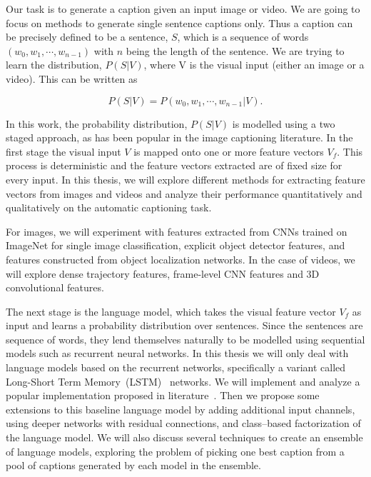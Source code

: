 Our task is to generate a caption given an input image or video. 
We are going to focus on methods to generate single sentence captions only. 
Thus a caption can be precisely defined to be a sentence, $S$, which is a
sequence of words $(w_0, w_1,\cdots, w_{n-1})$ with $n$ being the length of the
sentence. 
We are trying to learn the distribution, $P(S|V)$, where V is the visual
input (either an image or a video). 
This can be written as 

\begin{equation}
\label{eq:langB1} P(S|V) = P(w_0, w_1, \cdots, w_{n-1}|V)  .
\end{equation}

In this work, the probability distribution, $P(S|V)$ is modelled using a two
staged approach, as has been popular in the image captioning literature. 
In the first stage the visual input $V$ is mapped onto one or more feature
vectors $V_f$.
This process is deterministic and the feature vectors extracted are of fixed
size for every input. 
In this thesis, we will explore different methods for extracting feature
vectors from images and videos and analyze their performance quantitatively and
qualitatively on the automatic captioning task. 

For images, we will experiment with features extracted from CNNs trained on
ImageNet for single image classification, explicit object detector features, and
features constructed from object localization networks.
In the case of videos, we will explore dense trajectory features, frame-level
CNN features and 3D convolutional features. 

The next stage is the language model, which takes the visual feature vector
$V_f$ as input and learns a probability distribution over sentences.
Since the sentences are sequence of words, they lend themselves naturally to be
modelled using sequential models such as recurrent neural networks.
In this thesis we will only deal with language models based on the recurrent
networks, specifically a variant called Long-Short Term
Memory~(LSTM)~\cite{Hochreiter1997} networks.
We will implement and analyze a popular implementation proposed in
literature~\cite{Vinyals_2015_CVPR}.
Then we propose some extensions to this baseline language model by adding
additional input channels, using deeper networks with residual connections,
and class--based factorization of the language model. 
We will also discuss several techniques to create an ensemble of language
models, exploring the problem of picking one best caption from a pool of
captions generated by each model in the ensemble.

